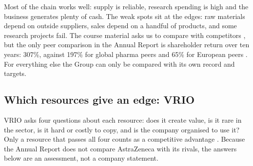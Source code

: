 \begin{analysis}
Most of the chain works well: supply is reliable, research spending is high and the business generates plenty of cash. The weak spots sit at the edges: raw materials depend on outside suppliers, sales depend on a handful of products, and some research projects fail. The course material asks us to compare with competitors \cite[p.~24]{PLAN}, but the only peer comparison in the Annual Report is shareholder return over ten years: 307\%, against 197\% for global pharma peers and 65\% for European peers \cite[p.~90]{AR}. For everything else the Group can only be compared with its own record and targets.
\end{analysis}

\subsection{Which resources give an edge: VRIO}
VRIO asks four questions about each resource: does it create value, is it rare in the sector, is it hard or costly to copy, and is the company organised to use it? Only a resource that passes all four counts as a competitive advantage \cite[p.~26]{PLAN}. Because the Annual Report does not compare AstraZeneca with its rivals, the answers below are an assessment, not a company statement.

